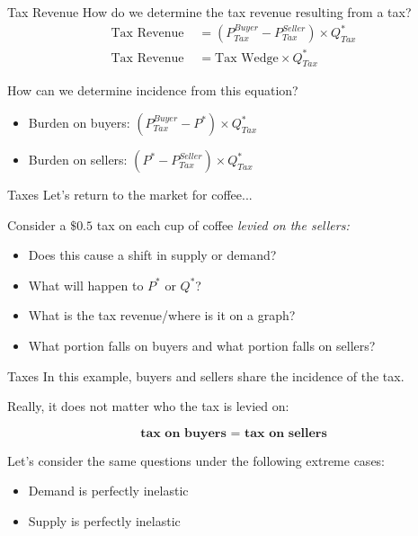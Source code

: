 \documentclass[compress]{beamer}
\begin{document}
\begin{frame}{Tax Revenue}
    How do we determine the tax revenue resulting from a tax?
    \begin{align*}
        \text{Tax Revenue } &= (P^{Buyer}_{Tax} - P^{Seller}_{Tax}) \times Q^*_{Tax} \\
        \text{Tax Revenue} &= \text{Tax Wedge} \times Q^*_{Tax}
    \end{align*}

    \begin{block}{How can we determine incidence from this equation?}
\begin{itemize}
    \item Burden on buyers: \((P^{Buyer}_{Tax} - P^*) \times Q^*_{Tax} \)
    \item Burden on sellers: \((P^* - P^{Seller}_{Tax}) \times Q^*_{Tax} \)
\end{itemize}
\end{block}
\end{frame}




\begin{frame}{Taxes}
    Let's return to the market for coffee...

    \begin{block}{Consider a $\$0.5$ tax on each cup of coffee \textit{levied on the sellers:}}
        \begin{itemize}
            \item Does this cause a shift in supply or demand?
            \item What will happen to $P^*$ or $Q^*$?
            \item What is the tax revenue/where is it on a graph?
            \item What portion falls on buyers and what portion falls on sellers?
        \end{itemize}
    \end{block}
\end{frame}

\begin{frame}{Taxes}
    In this example, buyers and sellers share the incidence of the tax.

\vspace{3mm}

    Really, it does not matter who the tax is levied on: 
    
    \[\textbf{tax on buyers = tax on sellers}\]

    \begin{block}{Let's consider the same questions under the following extreme cases:}
\begin{itemize}
    \item Demand is perfectly inelastic
    \item Supply is perfectly inelastic
\end{itemize}
    \end{block}
\end{frame}
\end{document}
